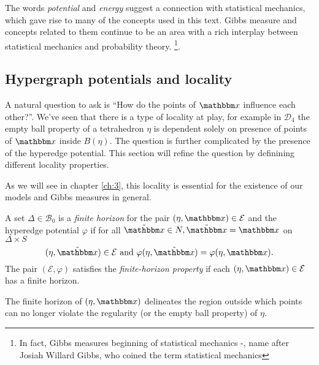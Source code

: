 The words \textit{potential} and \textit{energy} suggest a connection with statistical mechanics, which gave rise to many of the concepts used in this text. Gibbs measure and concepts related to them continue to be an area with a rich interplay between statistical mechanics and probability theory. \footnote{In fact, Gibbs measures beginning of statistical mechanics -, name after Josiah Willard Gibbs, who coined the term statistical mechanics}.




\subsection{Hypergraph potentials and locality}
A natural question to ask is ``How do the points of $\x$ influence each other?''. We've seen that there is a type of locality at play, for example in $\mathcal D_4$ the empty ball property of a tetrahedron $\eta$ is dependent solely on presence of points of $\x$ inside $B(\eta)$. The question is further complicated by the presence of the hyperedge potential. This section will refine the question by definining different locality properties.

As we will see in chapter \ref{ch:3}, this locality is essential for the existence of our models and Gibbs measures in general.

\begin{definition}
	A set $\Delta \in \mathcal B_0$ is a \textit{finite horizon} for the pair $(\eta,\x) \in \mathcal E$ and the hyperedge potential $\varphi$ if for all $\tilde{\x} \in N, \tilde{\x} = \x$ on $\Delta\times S$ 
$$(\eta,\tilde{\x})\in\mathcal E \text{ and } \varphi(\eta,\tilde{\x}) = \varphi(\eta,\x). $$
The pair $(\mathcal E, \varphi)$ satisfies the \textit{finite-horizon property} if each $(\eta,\x)\in \mathcal E$ has a finite horizon.
\end{definition}

The finite horizon of $(\eta,\x)$ delineates the region outside which points can no longer violate the regularity (or the empty ball property) of $\eta$. 

